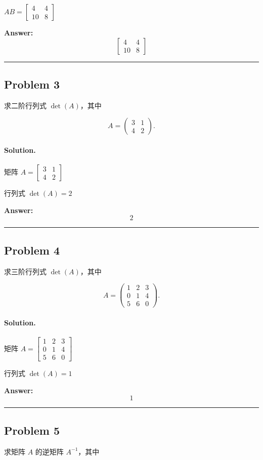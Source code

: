 \documentclass[12pt, a4paper]{ctexart}
\newcommand{\problem}[1]{\subsection*{Problem #1}}
\newcommand{\solution}{\paragraph{Solution.}}
\begin{document}
$AB = \left[\begin{matrix}4 & 4\\10 & 8\end{matrix}\right]$

\textbf{Answer:}
\[\boxed{\left[\begin{matrix}4 & 4\\10 & 8\end{matrix}\right]}\]

\vspace{1em}
\hrule
\vspace{1em}

\problem{3}

求二阶行列式 $\det(A)$，其中

$$A = \begin{pmatrix} 3 & 1 \\ 4 & 2 \end{pmatrix}.$$

\solution

矩阵 $A = \left[\begin{matrix}3 & 1\\4 & 2\end{matrix}\right]$

行列式 $\det(A) = 2$

\textbf{Answer:}
\[\boxed{2}\]

\vspace{1em}
\hrule
\vspace{1em}

\problem{4}

求三阶行列式 $\det(A)$，其中

$$A = \begin{pmatrix} 1 & 2 & 3 \\ 0 & 1 & 4 \\ 5 & 6 & 0 \end{pmatrix}.$$

\solution

矩阵 $A = \left[\begin{matrix}1 & 2 & 3\\0 & 1 & 4\\5 & 6 & 0\end{matrix}\right]$

行列式 $\det(A) = 1$

\textbf{Answer:}
\[\boxed{1}\]

\vspace{1em}
\hrule
\vspace{1em}

\problem{5}

求矩阵 $A$ 的逆矩阵 $A^{-1}$，其中
\end{document}
